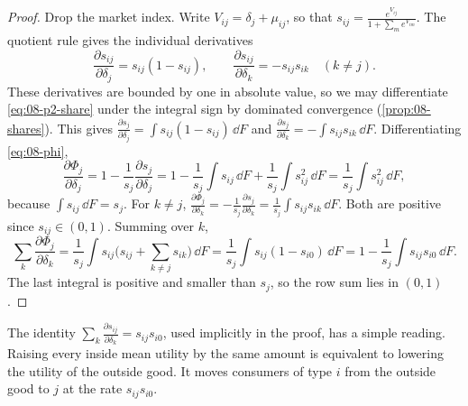 \begin{proof}
Drop the market index. Write $V_{ij} = \delta_j + \mu_{ij}$, so that $s_{ij} = \frac{e^{V_{ij}}}{1 +
\sum_m e^{V_{im}}}$. The quotient rule gives the individual derivatives
\begin{equation*}
  \frac{\partial s_{ij}}{\partial \delta_j} = s_{ij}(1 - s_{ij}), \qquad
  \frac{\partial s_{ij}}{\partial \delta_k} = -s_{ij}s_{ik} \quad (k \neq j).
\end{equation*}
These derivatives are bounded by one in absolute value, so we may differentiate \eqref{eq:08-p2-share}
under the integral sign by dominated convergence (\cref{prop:08-shares}). This gives
$\frac{\partial s_j}{\partial \delta_j} = \int s_{ij}(1 - s_{ij})\, \dd F$ and $\frac{\partial s_j}{\partial
\delta_k} = -\int s_{ij}s_{ik}\, \dd F$. Differentiating \eqref{eq:08-phi},
\begin{equation*}
  \frac{\partial \Phi_j}{\partial \delta_j} = 1 - \frac{1}{s_j}\frac{\partial s_j}{\partial \delta_j}
  = 1 - \frac{1}{s_j}\int s_{ij}\, \dd F + \frac{1}{s_j}\int s_{ij}^2\, \dd F
  = \frac{1}{s_j}\int s_{ij}^2\, \dd F,
\end{equation*}
because $\int s_{ij}\, \dd F = s_j$. For $k \neq j$, $\frac{\partial \Phi_j}{\partial \delta_k} =
-\frac{1}{s_j}\frac{\partial s_j}{\partial \delta_k} = \frac{1}{s_j}\int s_{ij}s_{ik}\, \dd F$. Both are
positive since $s_{ij} \in (0,1)$. Summing over $k$,
\begin{equation*}
  \sum_k \frac{\partial \Phi_j}{\partial \delta_k} = \frac{1}{s_j}\int s_{ij}\Big(s_{ij} + \sum_{k \neq
  j}s_{ik}\Big)\, \dd F = \frac{1}{s_j}\int s_{ij}(1 - s_{i0})\, \dd F = 1 - \frac{1}{s_j}\int s_{ij}s_{i0}\,
  \dd F.
\end{equation*}
The last integral is positive and smaller than $s_j$, so the row sum lies in $(0,1)$.
\end{proof}

The identity $\sum_k \frac{\partial s_{ij}}{\partial \delta_k} = s_{ij}s_{i0}$, used implicitly in the
proof, has a simple reading. Raising every inside mean utility by the same amount is equivalent to lowering
the utility of the outside good. It moves consumers of type $i$ from the outside good to $j$ at the rate
$s_{ij}s_{i0}$.


